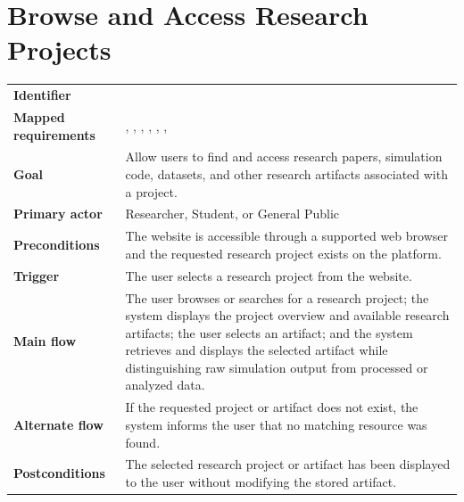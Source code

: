 \section{Browse and Access Research Projects}
\begin{tabularx}{\linewidth}{L{3.5cm}Y}
\toprule
\textbf{Identifier} & \\
\textbf{Mapped requirements} & , , , , , , \\
\textbf{Goal} & Allow users to find and access research papers, simulation code, datasets, and other research artifacts associated with a project.\\
\textbf{Primary actor} & Researcher, Student, or General Public\\
\textbf{Preconditions} & The website is accessible through a supported web browser and the requested research project exists on the platform.\\
\textbf{Trigger} & The user selects a research project from the website.\\
\textbf{Main flow} & The user browses or searches for a research project; the system displays the project overview and available research artifacts; the user selects an artifact; and the system retrieves and displays the selected artifact while distinguishing raw simulation output from processed or analyzed data.\\
\textbf{Alternate flow} & If the requested project or artifact does not exist, the system informs the user that no matching resource was found.\\
\textbf{Postconditions} & The selected research project or artifact has been displayed to the user without modifying the stored artifact.\\
\bottomrule
\end{tabularx}

